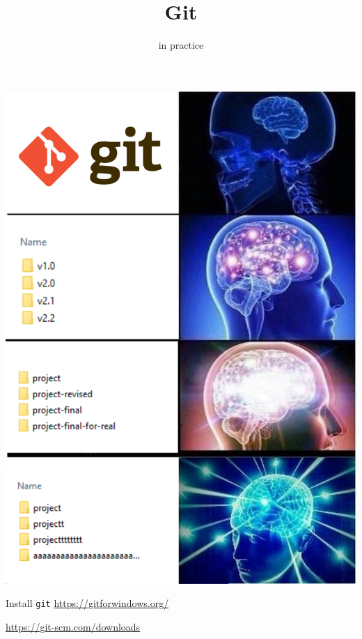 \documentclass[17pt]{beamer}
\title{Git}
\subtitle{in practice}
\begin{document}
\maketitle

\begin{frame}
  \centering
  \includegraphics[height=\textheight]{git-meme}
\end{frame}

\begin{frame}{Install \texttt{git}}
  \url{https://gitforwindows.org/}

  \url{https://git-scm.com/downloads}
\end{frame}
\end{document}
